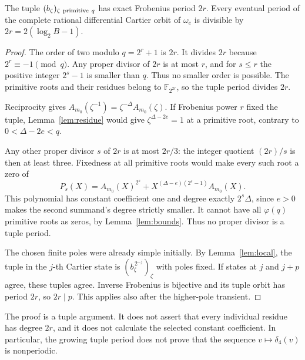 \begin{theorem}\label{thm:actual-period}
The tuple $(b_\zeta)_{\zeta\ {\rm primitive}\ q}$ has exact
Frobenius period $2r$. Every eventual period of the complete
rational differential Cartier orbit of $\omega_e$ is divisible
by $2r=2(\log_2 B-1)$.
\end{theorem}
\begin{proof}
The order of two modulo $q=2^r+1$ is $2r$.
It divides $2r$ because $2^r\equiv-1\pmod q$.
Any proper divisor of $2r$ is at most $r$, and for
$s\le r$ the positive integer $2^s-1$ is smaller than $q$.
Thus no smaller order is possible. The primitive roots and their
residues belong to $\mathbb F_{2^{2r}}$, so the tuple period
divides $2r$.

Reciprocity gives
$A_{m_0}(\zeta^{-1})=\zeta^{-\Delta}A_{m_0}(\zeta)$.
If Frobenius power $r$ fixed the tuple,
Lemma~\ref{lem:residue} would give
$\zeta^{\Delta-2e}=1$ at a primitive root, contrary to
$0<\Delta-2e<q$.

Any other proper divisor $s$ of $2r$ is at most $2r/3$:
the integer quotient $(2r)/s$ is then at least three.
Fixedness at all primitive roots would make every such root a zero of
\[
 P_s(X)=A_{m_0}(X)^{2^s}
       +X^{(\Delta-e)(2^s-1)}A_{m_0}(X).
\]
This polynomial has constant coefficient one and degree exactly
$2^s\Delta$, since $e>0$ makes the second summand's degree
strictly smaller. It cannot have all $\varphi(q)$ primitive roots
as zeros, by Lemma~\ref{lem:bounds}. Thus no proper divisor is a
tuple period.

The chosen finite poles were already simple initially.
By Lemma~\ref{lem:local}, the tuple in the $j$-th Cartier state is
$(b_\zeta^{\,2^{-j}})_\zeta$ with poles fixed. If states at
$j$ and $j+p$ agree, these tuples agree. Inverse Frobenius is
bijective and its tuple orbit has period $2r$, so $2r\mid p$.
This applies also after the higher-pole transient.
\end{proof}

The proof is a tuple argument. It does not assert that every individual
residue has degree $2r$, and it does not calculate the selected
constant coefficient. In particular, the growing tuple period does
not prove that the sequence $v\mapsto\delta_4(v)$ is nonperiodic.

